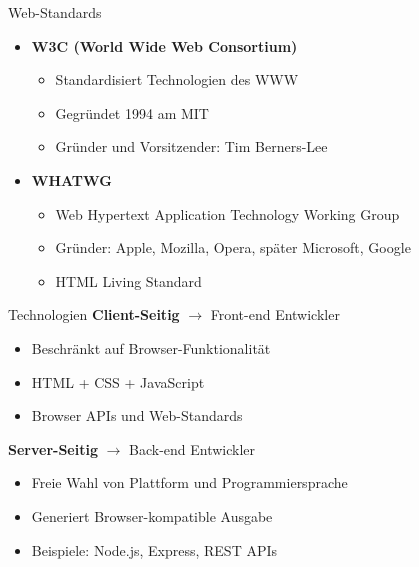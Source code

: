 \begin{theorem}{Web-Standards}
    \begin{itemize}
        \item \textbf{W3C (World Wide Web Consortium)}
            \begin{itemize}
                \item Standardisiert Technologien des WWW
                \item Gegründet 1994 am MIT
                \item Gründer und Vorsitzender: Tim Berners-Lee
            \end{itemize}
        \item \textbf{WHATWG}
            \begin{itemize}
                \item Web Hypertext Application Technology Working Group
                \item Gründer: Apple, Mozilla, Opera, später Microsoft, Google
                \item HTML Living Standard
            \end{itemize}
    \end{itemize}
\end{theorem}

\begin{concept}{Technologien}
    \textbf{Client-Seitig} $\rightarrow$ Front-end Entwickler
    \begin{itemize}
        \item Beschränkt auf Browser-Funktionalität
        \item HTML + CSS + JavaScript
        \item Browser APIs und Web-Standards
    \end{itemize}

    \textbf{Server-Seitig} $\rightarrow$ Back-end Entwickler
    \begin{itemize}
        \item Freie Wahl von Plattform und Programmiersprache
        \item Generiert Browser-kompatible Ausgabe
        \item Beispiele: Node.js, Express, REST APIs
    \end{itemize}
\end{concept}

